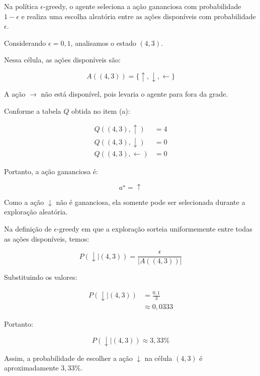 Na política $\epsilon$-greedy, o agente
seleciona a ação gananciosa com
probabilidade $1-\epsilon$ e realiza
uma escolha aleatória entre as ações
disponíveis com probabilidade $\epsilon$.

Considerando $\epsilon=0{,}1$,
analisamos o estado $(4,3)$.

Nessa célula, as ações disponíveis são:

\[
A((4,3))=
\{\uparrow,\downarrow,\leftarrow\}
\]

A ação $\rightarrow$ não está disponível,
pois levaria o agente para fora da grade.

Conforme a tabela $Q$ obtida no item (a):

\[
\begin{aligned}
Q((4,3),\uparrow)&=4\\
Q((4,3),\downarrow)&=0\\
Q((4,3),\leftarrow)&=0
\end{aligned}
\]

Portanto, a ação gananciosa é:

\[
a^\star=\uparrow
\]

Como a ação $\downarrow$ não é gananciosa,
ela somente pode ser selecionada
durante a exploração aleatória.

Na definição de $\epsilon$-greedy em que
a exploração sorteia uniformemente entre
todas as ações disponíveis, temos:

\[
P(\downarrow\mid(4,3))
=\frac{\epsilon}{|A((4,3))|}
\]

Substituindo os valores:

\[
\begin{aligned}
P(\downarrow\mid(4,3))
&=\frac{0{,}1}{3}\\
&\approx0{,}0333
\end{aligned}
\]

Portanto:

\[
\boxed{
P(\downarrow\mid(4,3))\approx3{,}33\%
}
\]

Assim, a probabilidade de escolher
a ação $\downarrow$ na célula $(4,3)$
é aproximadamente $3{,}33\%$.
